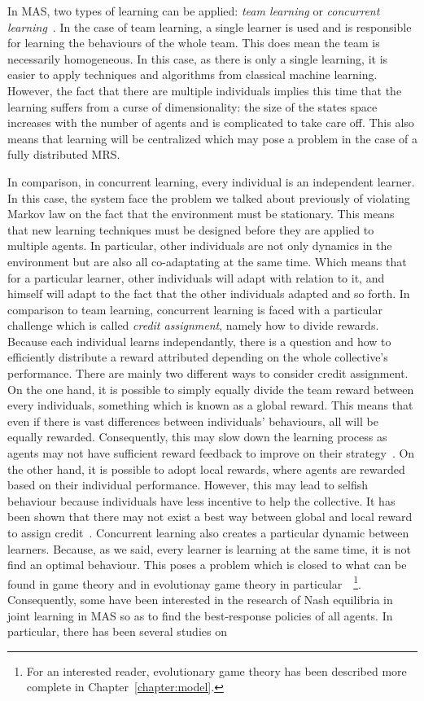     In MAS, two types of learning can be applied: \emph{team learning} or \emph{concurrent learning}~\parencite{Panait2005}. In the case of team learning, a single learner is used and is responsible for learning the behaviours of the whole team. This does mean the team is necessarily homogeneous. In this case, as there is only a single learning, it is easier to apply techniques and algorithms from classical machine learning. However, the fact that there are multiple individuals implies this time that the learning suffers from a curse of dimensionality: the size of the states space increases with the number of agents and is complicated to take care off. This also means that learning will be centralized which may pose a problem in the case of a fully distributed MRS. 

    In comparison, in concurrent learning, every individual is an independent learner. In this case, the system face the problem we talked about previously of violating Markov law on the fact that the environment must be stationary. This means that new learning techniques must be designed before they are applied to multiple agents. In particular, other individuals are not only dynamics in the environment but are also all co-adaptating at the same time. Which means that for a particular learner, other individuals will adapt with relation to it, and himself will adapt to the fact that the other individuals adapted and so forth. In comparison to team learning, concurrent learning is faced with a particular challenge which is called \emph{credit assignment}, namely how to divide rewards. Because each individual learns independantly, there is a question and how to efficiently distribute a reward attributed depending on the whole collective's performance. There are mainly two different ways to consider credit assignment. On the one hand, it is possible to simply equally divide the team reward between every individuals, something which is known as a global reward. This means that even if there is vast differences between individuals' behaviours, all will be equally rewarded. Consequently, this may slow down the learning process as agents may not have sufficient reward feedback to improve on their strategy~\parencite{Wolpert2001}. On the other hand, it is possible to adopt local rewards, where agents are rewarded based on their individual performance. However, this may lead to selfish behaviour because individuals have less incentive to help the collective. It has been shown that there may not exist a best way between global and local reward to assign credit~\parencite{Balch1999}. Concurrent learning also creates a particular dynamic between learners. Because, as we said, every learner is learning at the same time, it is not find an optimal behaviour. This poses a problem which is closed to what can be found in game theory and in evolutionay game theory in particular~\parencite{MaynardSmith1973, Fudenberg1998, Bloembergen2015}~\footnote{For an interested reader, evolutionary game theory has been described more complete in Chapter~\ref{chapter:model}.}. Consequently, some have been interested in the research of Nash equilibria in joint learning in MAS so as to find the best-response policies of all agents. In particular, there has been several studies on 